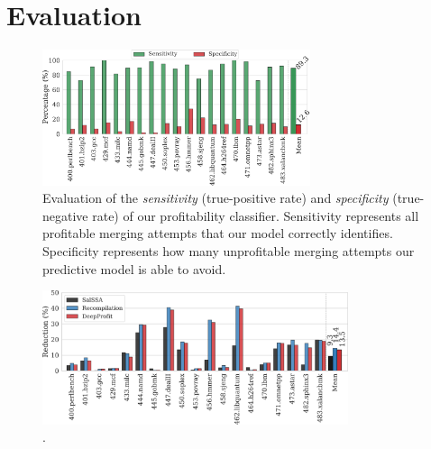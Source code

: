 \section{Evaluation}




\begin{figure}[h]
  \centering
  \includegraphics[width=0.7\textwidth]{src/deeplearning/figs/prediction-ss.pdf}
  \caption{Evaluation of the \textit{sensitivity} (true-positive rate) and \textit{specificity} (true-negative rate) of our profitability classifier.
  Sensitivity represents all profitable merging attempts that our model correctly identifies. 
  Specificity represents how many unprofitable merging attempts our predictive model is able to avoid.
  }
  \label{fig:prediction-ss}
\end{figure}


\begin{figure}[h]
  \centering
  \includegraphics[width=0.8\textwidth]{src/deeplearning/figs/code-size-reduction-threshold-tuning.pdf}
  \caption{.}
  \label{fig:code-size-reduction}
\end{figure}


